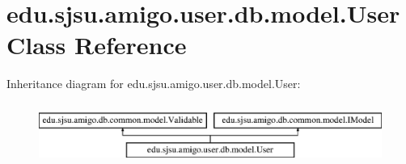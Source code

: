 \hypertarget{classedu_1_1sjsu_1_1amigo_1_1user_1_1db_1_1model_1_1_user}{}\section{edu.\+sjsu.\+amigo.\+user.\+db.\+model.\+User Class Reference}
\label{classedu_1_1sjsu_1_1amigo_1_1user_1_1db_1_1model_1_1_user}
Inheritance diagram for edu.\+sjsu.\+amigo.\+user.\+db.\+model.\+User\+:\begin{figure}[H]
\begin{center}
\leavevmode
\includegraphics[height=2.000000cm]{classedu_1_1sjsu_1_1amigo_1_1user_1_1db_1_1model_1_1_user}
\end{center}
\end{figure}
